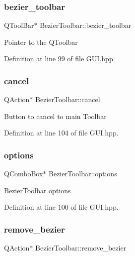 \subsubsection{\texorpdfstring{bezier\+\_\+toolbar}{bezier\_toolbar}}
{\footnotesize\ttfamily Q\+Tool\+Bar$\ast$ Bezier\+Toolbar\+::bezier\+\_\+toolbar}

Pointer to the Q\+Toolbar 

Definition at line 99 of file G\+U\+I.\+hpp.

\mbox{\label{structBezierToolbar_a5c91775ecfd6725f3707b5b838bcbbf9}} 
\subsubsection{\texorpdfstring{cancel}{cancel}}
{\footnotesize\ttfamily Q\+Action$\ast$ Bezier\+Toolbar\+::cancel}

Button to cancel to main Toolbar 

Definition at line 104 of file G\+U\+I.\+hpp.

\mbox{\label{structBezierToolbar_a84666bca25e5b6c194adaf0461c30ec3}} 
\subsubsection{\texorpdfstring{options}{options}}
{\footnotesize\ttfamily Q\+Combo\+Box$\ast$ Bezier\+Toolbar\+::options}

\mbox{\hyperlink{structBezierToolbar}{Bezier\+Toolbar}} options 

Definition at line 100 of file G\+U\+I.\+hpp.

\mbox{\label{structBezierToolbar_a1e1fd77e3baf09d382973b1ede4247cd}} 
\subsubsection{\texorpdfstring{remove\+\_\+bezier}{remove\_bezier}}
{\footnotesize\ttfamily Q\+Action$\ast$ Bezier\+Toolbar\+::remove\+\_\+bezier}

